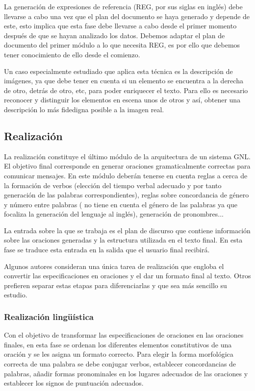 La generación de expresiones de referencia (REG, por sus siglas en inglés) debe llevarse a cabo una vez que el plan del documento se haya generado y depende de este, esto implica que esta fase debe llevarse a cabo desde el primer momento después de que se hayan analizado los datos. Debemos adaptar el plan de documento del primer módulo a lo que necesita REG, es por ello que debemos tener conocimiento de ello desde el comienzo.

Un caso especialmente estudiado que aplica esta técnica es la descripción de imágenes, ya que debe tener en cuenta si un elemento se encuentra a la derecha de otro, detrás de otro, etc, para poder enriquecer el texto. Para ello es necesario reconocer y distinguir los elementos en escena unos de otros y así, obtener una descripción lo más fidedigna posible a la imagen real.

\subsection{Realización}
La realización constituye el último módulo de la arquitectura de un sistema GNL. El objetivo final corresponde en generar oraciones gramaticalmente correctas para comunicar mensajes. En este módulo deberán tenerse en cuenta reglas a cerca de la formación de verbos (elección del tiempo verbal adecuado y por tanto generación de las palabras correspondientes), reglas sobre concordancia de género y número entre palabras (\cite{reiter1997building} no tiene en cuenta el género de las palabras ya que focaliza la generación del lenguaje al inglés), generación de pronombres...
 
La entrada sobre la que se trabaja es el plan de discurso que contiene información sobre las oraciones generadas y la estructura utilizada en el texto final. En esta fase se traduce esta entrada en la salida que el usuario final recibirá.

Algunos autores consideran una única tarea de realización que engloba el convertir las especificaciones en oraciones y el dar un formato final al texto. Otros prefieren separar estas etapas para diferenciarlas y que sea más sencillo su estudio.

\subsubsection{Realización lingüística}
Con el objetivo de transformar las especificaciones de oraciones en las oraciones finales, en esta fase se ordenan los diferentes elementos constitutivos de una oración y se les asigna un formato correcto. Para elegir la forma morfológica correcta de una palabra se debe conjugar verbos, establecer concordancias de palabras, añadir formas pronominales en los lugares adecuados de las oraciones y establecer los signos de puntuación adecuados. 

